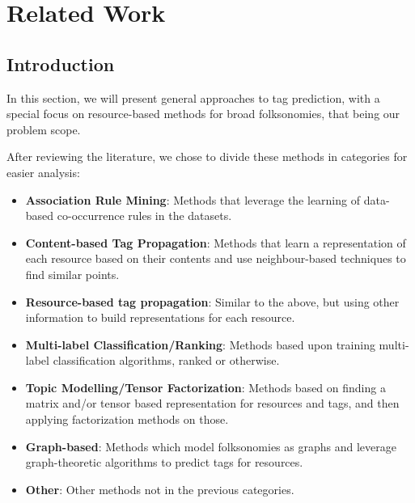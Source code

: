 \chapter{Related Work}\label{chap:related_work}

\section{Introduction}

In this section, we will present general approaches to tag prediction, with a special focus on resource-based methods for broad folksonomies, that being our problem scope.

After reviewing the literature, we chose to divide these methods in categories for easier analysis:

\begin{itemize}

    \item \textbf{Association Rule Mining}: Methods that leverage the learning of data-based co-occurrence rules in the datasets.
    
    \item \textbf{Content-based Tag Propagation}: Methods that learn a representation of each resource based on their contents and use neighbour-based techniques to find similar points.
    
    \item \textbf{Resource-based tag propagation}: Similar to the above, but using other information to build representations for each resource.
    
    \item \textbf{Multi-label Classification/Ranking}: Methods based upon training multi-label classification algorithms, ranked or otherwise.
    
    \item \textbf{Topic Modelling/Tensor Factorization}: Methods based on finding a matrix and/or tensor based representation for resources and tags, and then applying factorization methods on those.
    
    \item \textbf{Graph-based}: Methods which model folksonomies as graphs and leverage graph-theoretic algorithms to predict tags for resources.
    
    \item \textbf{Other}: Other methods not in the previous categories.

\end{itemize}

